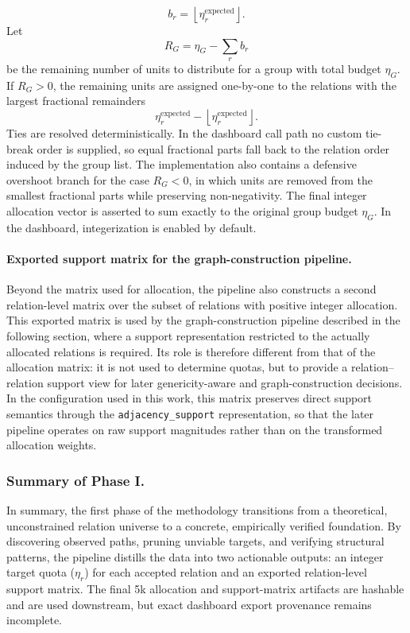 \documentclass[12pt,a4paper]{article}
\begin{document}
\[
b_r = \left\lfloor \eta^{\mathrm{expected}}_r \right\rfloor.
\]
Let
\[
R_G = \eta_G - \sum_r b_r
\]
be the remaining number of units to distribute for a group with total budget \(\eta_G\). If \(R_G > 0\), the remaining units are assigned one-by-one to the relations with the largest fractional remainders
\[
\eta^{\mathrm{expected}}_r - \left\lfloor \eta^{\mathrm{expected}}_r \right\rfloor.
\]
Ties are resolved deterministically. In the dashboard call path no custom tie-break order is supplied, so equal fractional parts fall back to the relation order induced by the group list. The implementation also contains a defensive overshoot branch for the case \(R_G < 0\), in which units are removed from the smallest fractional parts while preserving non-negativity. The final integer allocation vector is asserted to sum exactly to the original group budget \(\eta_G\). In the dashboard, integerization is enabled by default.

\paragraph{Exported support matrix for the graph-construction pipeline.}
Beyond the matrix used for allocation, the pipeline also constructs a second relation-level matrix over the subset of relations with positive integer allocation. This exported matrix is used by the graph-construction pipeline described in the following section, where a support representation restricted to the actually allocated relations is required. Its role is therefore different from that of the allocation matrix: it is not used to determine quotas, but to provide a relation--relation support view for later genericity-aware and graph-construction decisions. In the configuration used in this work, this matrix preserves direct support semantics through the \texttt{adjacency\_support} representation, so that the later pipeline operates on raw support magnitudes rather than on the transformed allocation weights.

\subsubsection{Summary of Phase I.}
In summary, the first phase of the methodology transitions from a theoretical, unconstrained relation universe to a concrete, empirically verified foundation. By discovering observed paths, pruning unviable targets, and verifying structural patterns, the pipeline distills the data into two actionable outputs: an integer target quota ($\eta_r$) for each accepted relation and an exported relation-level support matrix. The final 5k allocation and support-matrix artifacts are hashable and are used downstream, but exact dashboard export provenance remains incomplete.
\end{document}
